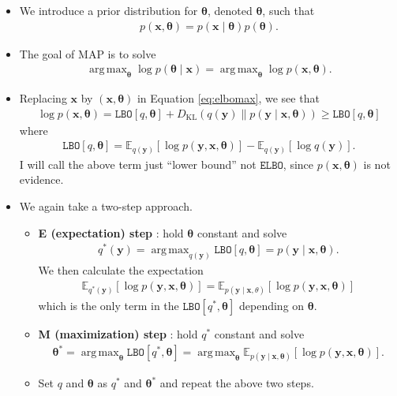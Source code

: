 \documentclass[10pt]{article}
\newcommand{\EE}{\mathbb{E}}
\newcommand{\lbo}{\texttt{LBO}}
\newcommand{\elbo}{\texttt{ELBO}}
\newcommand{\KL}{D_{\text{KL}}}
\DeclareMathOperator*{\argmax}{arg\,max}
\begin{document}
\begin{itemize}
\item We introduce a prior distribution for $\bm{\theta}$, denoted $\bm{\theta}$, such that
\begin{align*}
p(\bm{x},\bm{\theta}) = p(\bm{x} \mid \bm{\theta}) p(\bm{\theta}).
\end{align*}
\item The goal of MAP is to solve
\begin{align*}
\argmax_{\bm{\theta}} \log p(\bm{\theta} \mid \bm{x}) = \argmax_{\bm{\theta}} \log p(\bm{x}, \bm{\theta}).
\end{align*}
\item Replacing $\bm{x}$ by $(\bm{x},\bm{\theta})$ in Equation \eqref{eq:elbomax}, we see that
\begin{align*}
\log p(\bm{x},\bm{\theta}) = \lbo[q,\bm{\theta}] + \KL(q(\bm{y}) \| p(\bm{y} \mid \bm{x}, \bm{\theta})) \geq \lbo[q,\bm{\theta}]
\end{align*}
where
\begin{align*}
\lbo[q,\bm{\theta}] = \EE_{q(\bm{y})}[\log p(\bm{y}, \bm{x}, \bm{\theta})] - \EE_{q(\bm{y})}[\log q(\bm{y})].
\end{align*}
I will call the above term just \enquote{lower bound} not $\elbo$, since $p(\bm{x},\bm{\theta})$ is not evidence.
\item We again take a two-step approach.
\begin{itemize}
\item \textbf{E (expectation) step} : hold $\bm{\theta}$ constant and solve 
\begin{align*}
q^*(\bm{y}) = \argmax_{q(\bm{y})} \lbo[q,\bm{\theta}] = p(\bm{y} \mid \bm{x},\bm{\theta}).
\end{align*}
We then calculate the expectation
\begin{align*}
\EE_{q^*(\bm{y})} [ \log p(\bm{y},\bm{x}, \bm{\theta}) ] = \EE_{p(\bm{y} \mid \bm{x},\theta)} [ \log p(\bm{y},\bm{x}, \bm{\theta}) ]
\end{align*}
which is the only term in the $\lbo[q^*,\bm{\theta}]$ depending on $\bm{\theta}$.
\item \textbf{M (maximization) step} : hold $q^*$ constant and solve
\begin{align*}
\bm{\theta}^* = \argmax_{\bm{\theta}} \lbo[q^*,\bm{\theta}] = \argmax_{\bm{\theta}} \EE_{p(\bm{y} \mid \bm{x},\bm{\theta})} [ \log p(\bm{y},\bm{x}, \bm{\theta}) ].
\end{align*}
\item Set $q$ and $\bm{\theta}$ as $q^*$ and $\bm{\theta}^*$ and repeat the above two steps.

\end{itemize}
\end{itemize}
\end{document}
